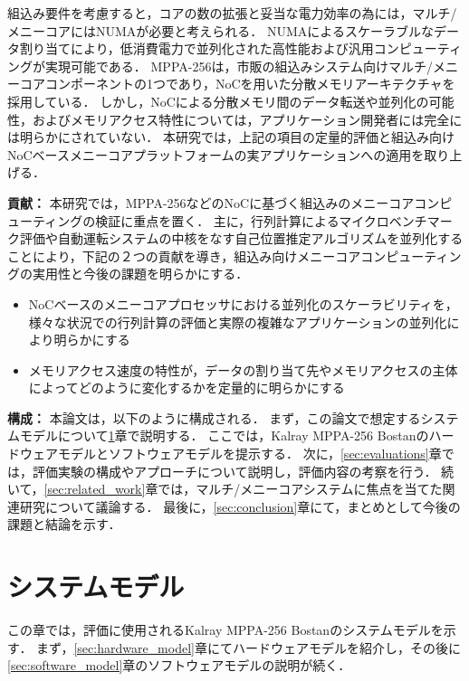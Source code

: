 \documentclass[submit,techrep]{ipsj_v2/UTF8/ipsj}
\begin{document}
組込み要件を考慮すると，コアの数の拡張と妥当な電力効率の為には，マルチ/メニーコアにはNUMAが必要と考えられる．
NUMAによるスケーラブルなデータ割り当てにより，低消費電力で並列化された高性能および汎用コンピューティングが実現可能である．
MPPA-256は，市販の組込みシステム向けマルチ/メニーコアコンポーネントの1つであり，NoCを用いた分散メモリアーキテクチャを採用している． 
しかし，NoCによる分散メモリ間のデータ転送や並列化の可能性，およびメモリアクセス特性については，アプリケーション開発者には完全には明らかにされていない．
本研究では，上記の項目の定量的評価と組込み向けNoCベースメニーコアプラットフォームの実アプリケーションへの適用を取り上げる．

\textbf{貢献：}
本研究では，MPPA-256などのNoCに基づく組込みのメニーコアコンピューティングの検証に重点を置く．
主に，行列計算によるマイクロベンチマーク評価や自動運転システムの中核をなす自己位置推定アルゴリズムを並列化することにより，下記の２つの貢献を導き，組込み向けメニーコアコンピューティングの実用性と今後の課題を明らかにする．

\begin{itemize}
\item NoCベースのメニーコアプロセッサにおける並列化のスケーラビリティを，様々な状況での行列計算の評価と実際の複雑なアプリケーションの並列化により明らかにする
\item メモリアクセス速度の特性が，データの割り当て先やメモリアクセスの主体によってどのように変化するかを定量的に明らかにする
\end{itemize}


\textbf{構成：}
本論文は，以下のように構成される．
まず，この論文で想定するシステムモデルについて\ref{sec:system_model}章で説明する．
ここでは，Kalray MPPA-256 Bostanのハードウェアモデルとソフトウェアモデルを提示する．
次に，\ref{sec:evaluations}章では，評価実験の構成やアプローチについて説明し，評価内容の考察を行う．
続いて，\ref{sec:related_work}章では，マルチ/メニーコアシステムに焦点を当てた関連研究について議論する．
最後に，\ref{sec:conclusion}章にて，まとめとして今後の課題と結論を示す．

\section{システムモデル}
\label{sec:system_model}
この章では，評価に使用されるKalray MPPA-256 Bostanのシステムモデルを示す．
まず，\ref{sec:hardware_model}章にてハードウェアモデルを紹介し，その後に\ref{sec:software_model}章のソフトウェアモデルの説明が続く．
\end{document}
